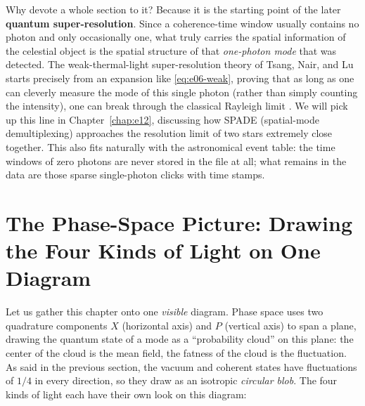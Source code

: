 Why devote a whole section to it? Because it is the starting point of the later \textbf{quantum super-resolution}. Since a coherence-time window usually contains no photon and only occasionally one, what truly carries the spatial information of the celestial object is the spatial structure of that \emph{one-photon mode} that was detected. The weak-thermal-light super-resolution theory of Tsang, Nair, and Lu starts precisely from an expansion like \eqref{eq:e06-weak}, proving that as long as one can cleverly measure the mode of this single photon (rather than simply counting the intensity), one can break through the classical Rayleigh limit \citep{2015Optic...2..646T,2016PhRvX...6c1033T}. We will pick up this line in Chapter~\ref{chap:e12}, discussing how SPADE (spatial-mode demultiplexing) approaches the resolution limit of two stars extremely close together. This also fits naturally with the astronomical event table: the time windows of zero photons are never stored in the file at all; what remains in the data are those sparse single-photon clicks with time stamps.

\section{The Phase-Space Picture: Drawing the Four Kinds of Light on One Diagram}
\label{sec:e06-phasespace}

Let us gather this chapter onto one \emph{visible} diagram. Phase space uses two quadrature components \(X\) (horizontal axis) and \(P\) (vertical axis) to span a plane, drawing the quantum state of a mode as a ``probability cloud'' on this plane: the center of the cloud is the mean field, the fatness of the cloud is the fluctuation. As said in the previous section, the vacuum and coherent states have fluctuations of \(1/4\) in every direction, so they draw as an isotropic \emph{circular blob}. The four kinds of light each have their own look on this diagram:

